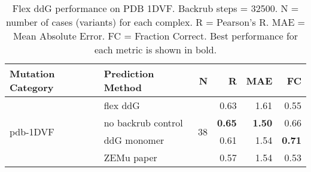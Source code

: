 \begin{table}
  \begin{tabular}{llrrrr}
\toprule
Mutation Category &   Prediction Method &   N &    R &  MAE &   FC \\
\midrule
 \multirow{ 4}{*}{pdb-1DVF} & flex ddG & \multirow{ 4}{*}{38} & 0.63 & 1.61 & 0.55  \\
 & no backrub control & & \textbf{0.65} & \textbf{1.50} & 0.66  \\
 & ddG monomer & & 0.61 & 1.54 & \textbf{0.71}  \\
 & ZEMu paper & & 0.57 & 1.54 & 0.53  \\
\bottomrule
\end{tabular}
  \caption[Flex ddG performance on PDB 1DVF]{
    Flex ddG performance on PDB 1DVF. Backrub steps = 32500. N = number of cases (variants) for each complex. R = Pearson's R. MAE = Mean Absolute Error. FC = Fraction Correct. Best performance for each metric is shown in bold.
  } \label{tab:table-pdb-1DVF}
\end{table}
